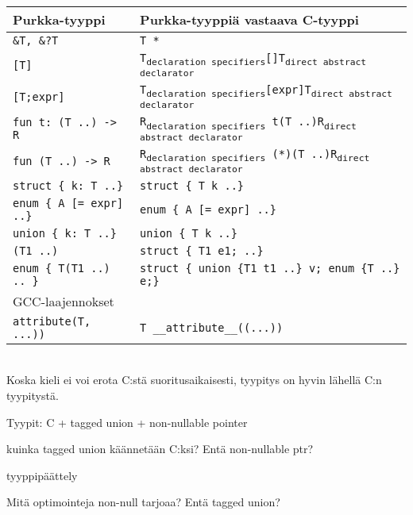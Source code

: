 \begin{tabular}{@{}ll@{}} \toprule
    Purkka-tyyppi & Purkka-tyyppiä vastaava C-tyyppi \\ \midrule
    \texttt{\&T, \&?T} & \texttt{T *} \\
    [0.2cm]

    \texttt{[T]} & \texttt{T\textsubscript{declaration specifiers}[]T\textsubscript{direct abstract declarator}} \\
    \texttt{[T;expr]} & \texttt{T\textsubscript{declaration specifiers}[expr]T\textsubscript{direct abstract declarator}} \\
    [0.2cm]

    \texttt{fun t: (T ..) -> R} & \texttt{R\textsubscript{declaration specifiers}~t(T ..)R\textsubscript{direct abstract declarator}} \\
    \texttt{fun (T ..) -> R} & \texttt{R\textsubscript{declaration specifiers}~(*)(T ..)R\textsubscript{direct abstract declarator}} \\
    [0.2cm]

    \texttt{struct \{ k: T ..\}} & \texttt{struct \{ T k ..\}} \\
    \texttt{enum \{ A [= expr] ..\}} & \texttt{enum \{ A [= expr] ..\}} \\
    \texttt{union \{ k: T ..\}} & \texttt{union \{ T k ..\}} \\
    [0.2cm]

    \texttt{(T1 ..)} & \texttt{struct \{ T1 e1; ..\}} \\
    \texttt{enum \{ T(T1 ..) .. \}} & \texttt{struct \{ union \{T1 t1 ..\} v; enum \{T ..\} e;\}} \\
    [0.2cm]

    GCC-laajennokset & \\
    \texttt{attribute(T, ...))} & \texttt{T \_\_attribute\_\_((...))} \\

    \bottomrule
\end{tabular} \\

Koska kieli ei voi erota C:stä suoritusaikaisesti, tyypitys on hyvin lähellä
C:n tyypitystä.

Tyypit:
 C + tagged union + non-nullable pointer

kuinka tagged union käännetään C:ksi? Entä non-nullable ptr?

tyyppipäättely

Mitä optimointeja non-null tarjoaa? Entä tagged union?

